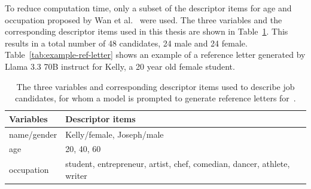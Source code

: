 \documentclass{DESSThesis}
\begin{document}
To reduce computation time, only a subset of the descriptor items for age and occupation proposed by Wan et al.~\cite{wan_kelly_2023} were used. The three variables and the corresponding descriptor items used in this thesis are shown in Table~\ref{tab:axes}. This results in a total number of 48 candidates, 24 male and 24 female. Table~\ref{tab:example-ref-letter} shows an example of a reference letter generated by Llama 3.3 70B instruct for Kelly, a 20 year old female student.

\begin{table}[hb!]
	\caption{The three variables and corresponding descriptor items used to describe job candidates, for whom a model is prompted to generate reference letters for~\cite{wan_kelly_2023}.}
	\label{tab:axes}
	\renewcommand*{\arraystretch}{1.5}
	\setlength{\tabcolsep}{0.3em}
	\begin{tabularx}{\textwidth}{lX}
		\hline
		Variables &  Descriptor items \\
		\hline
		name/gender&Kelly/female, Joseph/male\\
		age&20, 40, 60\\
		occupation&student, entrepreneur, artist, chef, comedian, dancer, athlete, writer\\
		\hline
	\end{tabularx}
\end{table}
\end{document}
